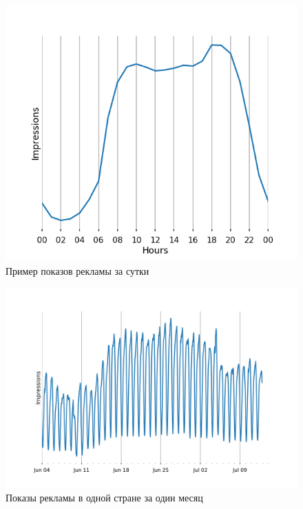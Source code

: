 \documentclass[%
12pt,
master,  %
natbib,      %
subf,        %
substylefile = spbu.rtx,
href,        %
colorlinks,  %
]{disser}
\begin{document}
\begin{figure}[!hhh]
	\begin{center}
		\includegraphics[width=12cm]{examples_day}
	\end{center}
	\vspace{-5mm}\caption{Пример показов рекламы за сутки}
	\label{fig:examples_day}
\end{figure}

\begin{figure}[!hhh]
	\begin{center}
		\includegraphics[width=12cm]{examples_month}
	\end{center}
	\vspace{-5mm}\caption{Показы рекламы в одной стране за один месяц}
	\label{fig:examples_month}
\end{figure}
\end{document}
